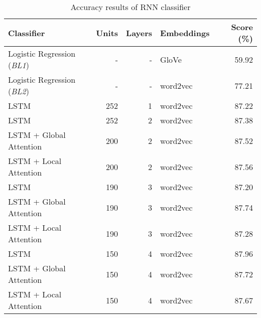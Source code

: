 \begin{table*}
	\centering
	\begin{tabular}{|l  r  r  l  r|}
		\hline
		\textbf{Classifier} & \textbf{Units} & \textbf{Layers} & \textbf{Embeddings} & \textbf{Score} (\%) \\ \hline
		Logistic Regression (\textit{BL1}) & - & - & GloVe & 59.92 \\ \hline
		Logistic Regression (\textit{BL2}) & - & - & word2vec  & 77.21 \\ \hline
		LSTM & 252 & 1 & word2vec & 87.22 \\ \hline
		LSTM & 252 & 2 & word2vec & 87.38 \\ \hline
		LSTM + Global Attention &  200 & 2 & word2vec & 87.52 \\ \hline
		LSTM + Local Attention &  200 & 2 & word2vec & 87.56 \\ \hline				
		LSTM & 190 & 3 & word2vec & 87.20 \\ \hline
		LSTM + Global Attention & 190 & 3 & word2vec &  87.74 \\ \hline
		LSTM + Local Attention &  190  & 3 & word2vec & 87.28 \\ \hline
		LSTM & 150 & 4 & word2vec & 87.96 \\ \hline		
		LSTM + Global Attention & 150 & 4 & word2vec & 87.72 \\ \hline
		LSTM + Local Attention & 150 & 4 & word2vec & 87.67 \\ \hline		
	\end{tabular}
	\caption{Accuracy results of RNN classifier}
	\label{tab:rnn-class-results}
\end{table*}